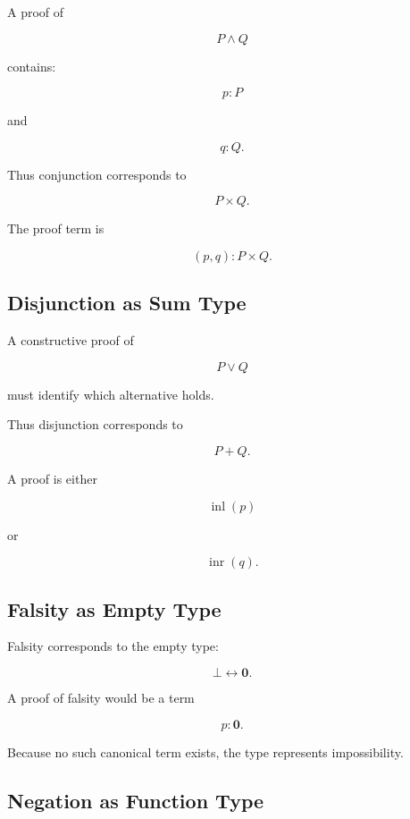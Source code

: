 A proof of

\[
P\land Q
\]

contains:

\[
\boxed{
p:P
}
\]

and

\[
\boxed{
q:Q.
}
\]

Thus conjunction corresponds to

\[
\boxed{
P\times Q.
}
\]

The proof term is

\[
\boxed{
(p,q):P\times Q.
}
\]

\subsection{Disjunction as Sum Type}
\label{subsec:type-theory-disjunction}

A constructive proof of

\[
P\lor Q
\]

must identify which alternative holds.

Thus disjunction corresponds to

\[
\boxed{
P+Q.
}
\]

A proof is either

\[
\boxed{
\operatorname{inl}(p)
}
\]

or

\[
\boxed{
\operatorname{inr}(q).
}
\]

\subsection{Falsity as Empty Type}
\label{subsec:falsity-empty-type}

Falsity corresponds to the empty type:

\[
\boxed{
\bot
\leftrightarrow
\mathbf{0}.
}
\]

A proof of falsity would be a term

\[
\boxed{
p:\mathbf{0}.
}
\]

Because no such canonical term exists, the type represents impossibility.

\subsection{Negation as Function Type}
\label{subsec:type-theory-negation}

